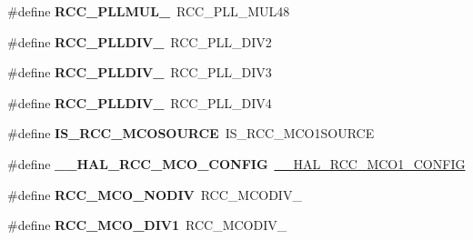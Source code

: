 \begin{DoxyCompactItemize}
\#define {\bfseries R\+C\+C\+\_\+\+P\+L\+L\+M\+U\+L\+\_}~R\+C\+C\+\_\+\+P\+L\+L\+\_\+\+M\+U\+L48
\item 
\mbox{\label{group___h_a_l___r_c_c___aliased_ga3b43997b2f4c57fb68632db0ff63ef77}} 
\#define {\bfseries R\+C\+C\+\_\+\+P\+L\+L\+D\+I\+V\+\_}~R\+C\+C\+\_\+\+P\+L\+L\+\_\+\+D\+I\+V2
\item 
\mbox{\label{group___h_a_l___r_c_c___aliased_ga64492e160608f79d4c3c751f82d09dfc}} 
\#define {\bfseries R\+C\+C\+\_\+\+P\+L\+L\+D\+I\+V\+\_}~R\+C\+C\+\_\+\+P\+L\+L\+\_\+\+D\+I\+V3
\item 
\mbox{\label{group___h_a_l___r_c_c___aliased_gaa25c3a8a7576db9c75ea868632d86120}} 
\#define {\bfseries R\+C\+C\+\_\+\+P\+L\+L\+D\+I\+V\+\_}~R\+C\+C\+\_\+\+P\+L\+L\+\_\+\+D\+I\+V4
\item 
\mbox{\label{group___h_a_l___r_c_c___aliased_ga6ae382b78e1bcec3da6d5ac79b1a5551}} 
\#define {\bfseries I\+S\+\_\+\+R\+C\+C\+\_\+\+M\+C\+O\+S\+O\+U\+R\+CE}~I\+S\+\_\+\+R\+C\+C\+\_\+\+M\+C\+O1\+S\+O\+U\+R\+CE
\item 
\mbox{\label{group___h_a_l___r_c_c___aliased_ga4a5994f41cd6798807bf8672ec3dc423}} 
\#define {\bfseries \+\_\+\+\_\+\+H\+A\+L\+\_\+\+R\+C\+C\+\_\+\+M\+C\+O\+\_\+\+C\+O\+N\+F\+IG}~\hyperlink{group___r_c_c_ex___m_c_ox___clock___config_ga7e5f7f1efc92794b6f0e96068240b45e}{\+\_\+\+\_\+\+H\+A\+L\+\_\+\+R\+C\+C\+\_\+\+M\+C\+O1\+\_\+\+C\+O\+N\+F\+IG}
\item 
\mbox{\label{group___h_a_l___r_c_c___aliased_ga897ae3aa8cfe31f7b00de98637db45d5}} 
\#define {\bfseries R\+C\+C\+\_\+\+M\+C\+O\+\_\+\+N\+O\+D\+IV}~R\+C\+C\+\_\+\+M\+C\+O\+D\+I\+V\+\_
\item 
\mbox{\label{group___h_a_l___r_c_c___aliased_ga411caf05a68e3bd8f14150c14d1f8404}} 
\#define {\bfseries R\+C\+C\+\_\+\+M\+C\+O\+\_\+\+D\+I\+V1}~R\+C\+C\+\_\+\+M\+C\+O\+D\+I\+V\+\_
\item 
\mbox{\label{group___h_a_l___r_c_c___aliased_ga49e93c717ea6b0916051b085aa595ecb}} 

\end{DoxyCompactItemize}

